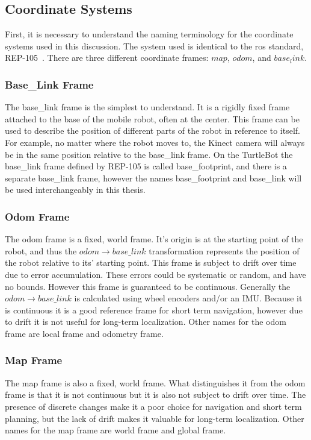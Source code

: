 \documentclass[thesis.tex]{subfile}
\begin{document}
\subsection{Coordinate Systems}
First, it is necessary to understand the naming terminology for the coordinate systems used in this discussion. The system used is identical to the \gls{ros} standard, REP-105~\cite{REP_105}. There are three different coordinate frames: $map$, $odom$, and $base_link$.

\subsubsection{Base\_Link Frame}
The base\_link frame is the simplest to understand. It is a rigidly fixed frame attached to the base of the mobile robot, often at the center. This frame can be used to describe the position of different parts of the robot in reference to itself. For example, no matter where the robot moves to, the Kinect camera will always be in the same position relative to the base\_link frame. On the TurtleBot the base\_link frame defined by REP-105 is called base\_footprint, and there is a separate base\_link frame, however the names base\_footprint and base\_link will be used interchangeably in this thesis. 

\subsubsection{Odom Frame}
The odom frame is a fixed, world frame. It's origin is at the starting point of the robot, and thus the $odom \rightarrow base\_link$ transformation represents the position of the robot relative to its' starting point. This frame is subject to drift over time due to error accumulation. These errors could be systematic or random, and have no bounds. However this frame is guaranteed to be continuous. Generally the $odom \rightarrow base\_link$ is calculated using wheel encoders and/or an IMU. Because it is continuous it is a good reference frame for short term navigation, however due to drift it is not useful for long-term localization. Other names for the odom frame are local frame and odometry frame.

\subsubsection{Map Frame}
The map frame is also a fixed, world frame. What distinguishes it from the odom frame is that it is not continuous but it is also not subject to drift over time. The presence of discrete changes make it a poor choice for navigation and short term planning, but the lack of drift makes it valuable for long-term localization. Other names for the map frame are world frame and global frame.
 
\end{document}
